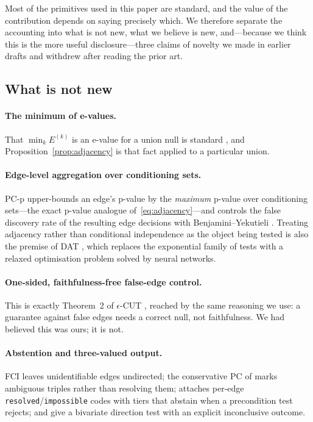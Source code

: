 \documentclass[pdflatex,sn-apa]{sn-jnl}
\theoremstyle{thmstyleone}%
\theoremstyle{thmstyletwo}%
\theoremstyle{thmstylethree}%
\begin{document}
Most of the primitives used in this paper are standard, and the value of the
contribution depends on saying precisely which. We therefore separate the
accounting into what is not new, what we believe is new, and---because we
think this is the more useful disclosure---three claims of novelty we made in
earlier drafts and withdrew after reading the prior art.

\subsection{What is not new}\label{sec:notnew}

\paragraph{The minimum of e-values.} That $\min_k E^{(k)}$ is an e-value for a
union null is standard \citep{vovk2021evalues}, and
Proposition~\ref{prop:adjacency} is that fact applied to a particular union.

\paragraph{Edge-level aggregation over conditioning sets.} PC-p
\citep{strobl2019estimating} upper-bounds an edge's p-value by the
\emph{maximum} p-value over conditioning sets---the exact p-value analogue
of~\eqref{eq:adjacency}---and controls the false discovery rate of the
resulting edge decisions with Benjamini--Yekutieli
\citep{benjamini2001control}. Treating adjacency rather than conditional
independence as the object being tested is also the premise of DAT
\citep{amin2024scalable}, which replaces the exponential family of tests with
a relaxed optimisation problem solved by neural networks.

\paragraph{One-sided, faithfulness-free false-edge control.} This is exactly
Theorem~2 of $\epsilon$-CUT \citep{shaska2025causal}, reached by the same
reasoning we use: a guarantee against false edges needs a correct null, not
faithfulness. We had believed this was ours; it is not.

\paragraph{Abstention and three-valued output.} FCI leaves unidentifiable
edges undirected; the conservative PC of \citet{ramsey2006adjacency} marks
ambiguous triples rather than resolving them; \citet{uehara2026iterative}
attaches per-edge \texttt{resolved}/\texttt{impossible} codes with tiers that
abstain when a precondition test rejects; and \citet{prakash2024diagnostic}
give a bivariate direction test with an explicit inconclusive outcome.
\end{document}
